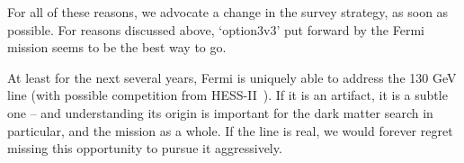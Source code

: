 \documentclass[aps,prd,superscriptaddress,nofootinbib,fixlfloat, 12pt]{revtex4-1}
\begin{document}
For all of these reasons, we advocate a change in the survey strategy, as soon
as possible. For reasons discussed above, `option3v3' put forward by the Fermi
mission seems to be the best way to go.

At least for the next several years, Fermi is uniquely able to address the 130
GeV line (with possible competition from HESS-II~\cite{Bergstrom:2012vd}).
If it is an artifact, it is a subtle one -- and understanding its
origin is important for the dark matter search in
particular, and the mission as a whole. If the line is real, we would forever
regret missing this opportunity to pursue it aggressively. 

\clearpage

\end{document}
